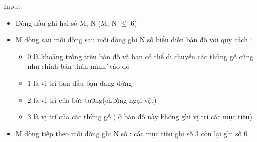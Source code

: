Input
\begin{itemize}
	\item Dòng đầu ghi hai số M, N (M, N  $\le$  6)
	\item M dòng sau mỗi dòng sau mỗi dòng ghi N số biểu diễn bản đồ với quy cách :
\begin{itemize}
	\item 0 là khoảng trống trên bản đồ và bạn có thể di chuyển các thùng gỗ cũng như chính bản thân mình^^ vào đó
	\item 1 là vị trí ban đầu bạn đang đứng
	\item 2 là vị trí của bức tường(chướng ngại vật)
	\item 3 là vị trí của các thùng gỗ ( ở bản đồ này không ghi vị trí các mục tiêu)
\end{itemize}
	\item M dòng tiếp theo mỗi dòng ghi N số : các mục tiêu ghi số 3 còn lại ghi số 0
\end{itemize}